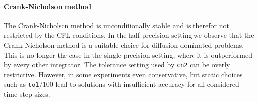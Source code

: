 \documentclass{scrartcl}
\begin{document}
	\paragraph{Crank-Nicholson method}
	The Crank-Nicholson method is unconditionally stable and is therefor not restricted by the CFL conditions. In the half precision setting we observe that the Crank-Nicholson method is a suitable choice for diffusion-dominated problems. This is no longer the case in the single precision setting, where it is outperformed by every other integrator. The tolerance setting used by \texttt{cn2} can be overly restrictive. However, in some experiments even conservative, but static choices such as $\texttt{tol}/100$ lead to solutions with insufficient accuracy for all considered time step sizes.\\
	
\end{document}
